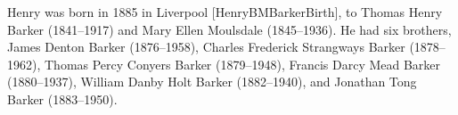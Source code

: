 
Henry was born in 1885 in Liverpool [HenryBMBarkerBirth],  to Thomas Henry Barker (1841--1917) and Mary Ellen Moulsdale (1845--1936). He had six brothers,  James Denton Barker (1876--1958), Charles Frederick Strangways Barker (1878--1962), Thomas Percy Conyers Barker (1879--1948), Francis Darcy Mead Barker (1880--1937), William Danby Holt Barker (1882--1940), and Jonathan Tong Barker (1883--1950).

